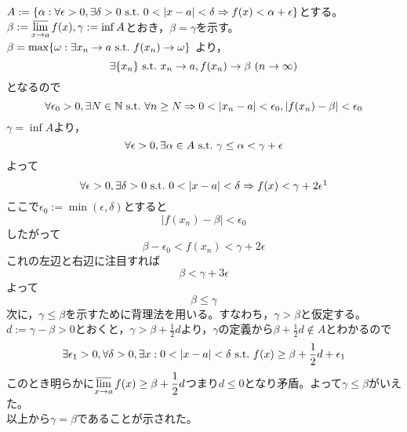 \documentclass[dvipdfmx,a4j,10pt]{jsarticle}
\makeatletter
\theoremstyle{mystyle1}
\theoremstyle{mystyle2}
\renewenvironment{proof}[1][\proofname]{\par
  \pushQED{\qed}%
  \normalfont
  \topsep6\p@\@plus6\p@ \trivlist
  \item[\hskip\labelsep{\bfseries\sffamily #1}]\ignorespaces
}{%
  \popQED\endtrivlist\@endpefalse
}
\renewcommand\proofname{証明}
\makeatother
\begin{document}
\begin{proof}[命題\ref{prop5.12}の証明]
    $A:=\{\alpha:\forall\epsilon>0,\exists\delta>0\ {\rm s.t.}\ 0<|x-a|<\delta \Rightarrow f(x)<\alpha+\epsilon\}$とする。
    $\displaystyle\beta:=\varlimsup_{x\to a}f(x),\gamma :=\inf{A}$とおき，$\beta=\gamma$を示す。\\
    $\beta=\max\{\omega:\exists x_n\to a \ {\rm s.t.}\ f(x_n)\to\omega\}$
    より，
    \[
    \exists\{x_n\} \ {\rm s.t.}\ x_n\to a,f(x_n)\to \beta \ (n\to\infty)
    \]
    となるので
    \[
    \forall\epsilon_0>0,\exists N\in\mathbb{N} \ {\rm s.t.}\ \forall n\geq N \Rightarrow 0<|x_n-a|<\epsilon_0,|f(x_n)-\beta|<\epsilon_0
    \]
    $\gamma=\inf{A}$より，
    \[
    \forall \epsilon>0,\exists \alpha\in A \ {\rm s.t. } \ \gamma\leq\alpha<\gamma+\epsilon
    \]
    よって
    \[
    \forall\epsilon>0,\exists\delta>0 \ {\rm s.t.}\ 0<|x-a|<\delta \Rightarrow f(x)<\gamma+2\epsilon \footnotemark
    \]
    ここで$\epsilon_0:=\min(\epsilon,\delta)$とすると
    \[
    |f(x_n)-\beta|<\epsilon_0
    \]
    したがって
    \[
    \beta-\epsilon_0<f(x_n)<\gamma+2\epsilon
    \]
    これの左辺と右辺に注目すれば
    \[
    \beta<\gamma+3\epsilon
    \]
    よって
    \[
    \beta\leq\gamma
    \]
    次に，$\gamma\leq\beta$を示すために背理法を用いる。すなわち，$\gamma>\beta$と仮定する。\\
    $d:=\gamma-\beta>0$とおくと，$\displaystyle\gamma>\beta+\frac{1}{2}d$より，$\gamma$の定義から$\displaystyle\beta+\frac{1}{2}d\notin A$とわかるので
    \[
    \exists\epsilon_1>0,\forall\delta>0, \exists x:0<|x-a|<\delta \ {\rm s.t.} \ f(x)\geq\beta+\frac{1}{2}d+\epsilon_1
    \]
    このとき明らかに$\displaystyle \varlimsup_{x\to a}f(x)\geq\beta+\frac{1}{2}d$つまり$d\leq0$となり矛盾。よって$\gamma\leq\beta$がいえた。\\
    以上から$\gamma=\beta$であることが示された。
\end{proof}

\newpage
\end{document}
